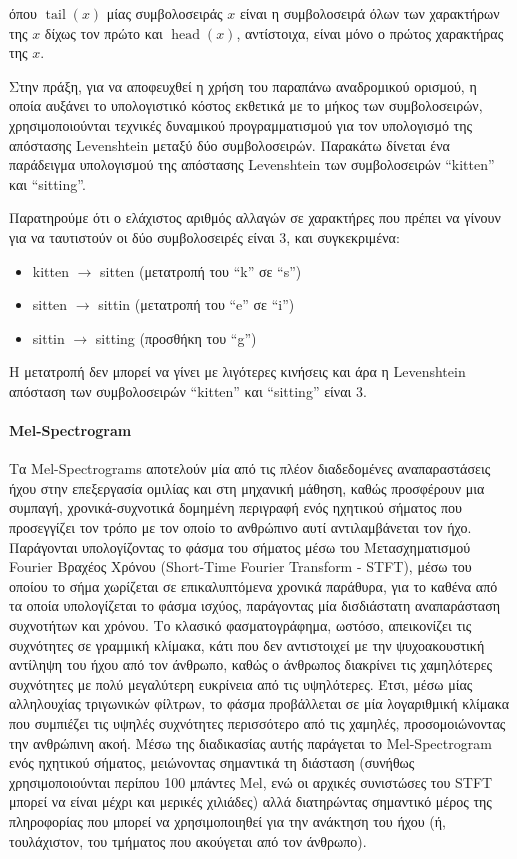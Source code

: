 όπου $\operatorname{tail}(x)$ μίας συμβολοσειράς $x$ είναι η συμβολοσειρά όλων των χαρακτήρων της $x$ δίχως τον πρώτο και $\operatorname{head}(x)$, αντίστοιχα, είναι μόνο ο πρώτος χαρακτήρας της $x$.

Στην πράξη, για να αποφευχθεί η χρήση του παραπάνω αναδρομικού ορισμού, η οποία αυξάνει το υπολογιστικό κόστος εκθετικά με το μήκος των συμβολοσειρών, χρησιμοποιούνται τεχνικές δυναμικού προγραμματισμού για τον υπολογισμό της απόστασης Levenshtein μεταξύ δύο συμβολοσειρών. Παρακάτω δίνεται ένα παράδειγμα υπολογισμού της απόστασης Levenshtein των συμβολοσειρών ``kitten'' και ``sitting''.

Παρατηρούμε ότι ο ελάχιστος αριθμός αλλαγών σε χαρακτήρες που πρέπει να γίνουν για να ταυτιστούν οι δύο συμβολοσειρές είναι 3, και συγκεκριμένα:

\begin{itemize}
\item kitten $\rightarrow$ sitten (μετατροπή του ``k'' σε ``s'')
\item sitten $\rightarrow$ sittin (μετατροπή του ``e'' σε ``i'')
\item sittin $\rightarrow$ sitting (προσθήκη του ``g'')
\end{itemize}

Η μετατροπή δεν μπορεί να γίνει με λιγότερες κινήσεις και άρα η Levenshtein απόσταση των συμβολοσειρών ``kitten'' και ``sitting'' είναι 3.

\paragraph{Mel-Spectrogram}

Τα Mel-Spectrograms αποτελούν μία από τις πλέον διαδεδομένες αναπαραστάσεις ήχου στην επεξεργασία ομιλίας και στη μηχανική μάθηση, καθώς προσφέρουν μια συμπαγή, χρονικά-συχνοτικά δομημένη περιγραφή ενός ηχητικού σήματος που προσεγγίζει τον τρόπο με τον οποίο το ανθρώπινο αυτί αντιλαμβάνεται τον ήχο. Παράγονται υπολογίζοντας το φάσμα του σήματος μέσω του Μετασχηματισμού Fourier Βραχέος Χρόνου (Short-Time Fourier Transform - STFT), μέσω του οποίου το σήμα χωρίζεται σε επικαλυπτόμενα χρονικά παράθυρα, για το καθένα από τα οποία υπολογίζεται το φάσμα ισχύος, παράγοντας μία δισδιάστατη αναπαράσταση συχνοτήτων και χρόνου. Το κλασικό φασματογράφημα, ωστόσο, απεικονίζει τις συχνότητες σε γραμμική κλίμακα, κάτι που δεν αντιστοιχεί με την ψυχοακουστική αντίληψη του ήχου από τον άνθρωπο, καθώς ο άνθρωπος διακρίνει τις χαμηλότερες συχνότητες με πολύ μεγαλύτερη ευκρίνεια από τις υψηλότερες. Έτσι, μέσω μίας αλληλουχίας τριγωνικών φίλτρων, το φάσμα προβάλλεται σε μία λογαριθμική κλίμακα που συμπιέζει τις υψηλές συχνότητες περισσότερο από τις χαμηλές, προσομοιώνοντας την ανθρώπινη ακοή. Μέσω της διαδικασίας αυτής παράγεται το Mel-Spectrogram ενός ηχητικού σήματος, μειώνοντας σημαντικά τη διάσταση (συνήθως χρησιμοποιούνται περίπου 100 μπάντες Mel, ενώ οι αρχικές συνιστώσες του STFT μπορεί να είναι μέχρι και μερικές χιλιάδες) αλλά διατηρώντας σημαντικό μέρος της πληροφορίας που μπορεί να χρησιμοποιηθεί για την ανάκτηση του ήχου (ή, τουλάχιστον, του τμήματος που ακούγεται από τον άνθρωπο).


